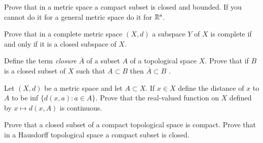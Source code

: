 \documentclass[12pt]{exam}
\theoremstyle{definition}
\newcommand{\R}{\mathcal{R}}
\def\R{{ \Bbb R}}
\begin{document}
\begin{questions}

\question

Prove that in a metric space a compact subset is closed and bounded.
If you cannot do it for a general metric space do it for $\R^n$.

\question

Prove that in a complete metric space $(X,d)$ a subspace $Y$ of $X$
is complete if and only if it is a closed subspace of $X$.

\question

Define the term \emph{closure} $\overline{A}$ of a subset $A$ of a
topological space $X$. Prove that if $B$ is a closed subset of $X$
such that $A \subset B$ then $\overline{A} \subset B$ .



\question

Let $(X,d)$ be a metric space and let $A \subset X$. If $x \in X$
define the distance of $x$ to $A$ to be inf $\{d(x,a): a \in A\}$.
Prove that the real-valued function on $X$ defined by $x \mapsto
d(x,A)$ is continuous.

\question

Prove that a closed subset of a compact topological space is
compact. Prove that in a Hausdorff topological space a compact
subset is closed.



\end{questions}
\end{document}
